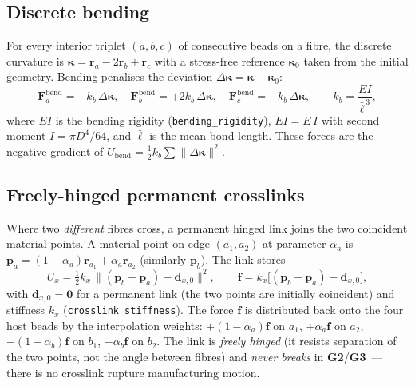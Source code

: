 \documentclass[11pt]{article}
\newcommand{\rv}{\mathbf{r}}
\newcommand{\Fv}{\mathbf{F}}
\newcommand{\GTwo}{\textcolor{g2col}{\textbf{G2}}}
\newcommand{\GThree}{\textcolor{g3col}{\textbf{G3}}}
\newcommand{\code}[1]{\texttt{\small #1}}
\begin{document}
\subsection{Discrete bending}

For every interior triplet $(a,b,c)$ of consecutive beads on a fibre, the discrete curvature is
$\boldsymbol\kappa = \rv_a - 2\rv_b + \rv_c$ with a stress-free reference $\boldsymbol\kappa_0$
taken from the initial geometry. Bending penalises the deviation
$\Delta\boldsymbol\kappa=\boldsymbol\kappa-\boldsymbol\kappa_0$:
\begin{equation}
  \Fv_a^{\text{bend}} = -k_b\,\Delta\boldsymbol\kappa,\quad
  \Fv_b^{\text{bend}} = +2k_b\,\Delta\boldsymbol\kappa,\quad
  \Fv_c^{\text{bend}} = -k_b\,\Delta\boldsymbol\kappa,
  \qquad
  k_b = \frac{EI}{\bar\ell^{\,3}},
  \label{eq:bend}
\end{equation}
where $EI$ is the bending rigidity (\code{bending\_rigidity}), $EI = E\,I$ with second moment
$I=\pi D^4/64$, and $\bar\ell$ is the mean bond length. These forces are the negative gradient of
$U_{\text{bend}}=\tfrac12 k_b\sum\|\Delta\boldsymbol\kappa\|^2$.

\subsection{Freely-hinged permanent crosslinks}

Where two \emph{different} fibres cross, a permanent hinged link joins the two coincident
material points. A material point on edge $(a_1,a_2)$ at parameter $\alpha_a$ is
$\mathbf p_a=(1-\alpha_a)\rv_{a_1}+\alpha_a\rv_{a_2}$ (similarly $\mathbf p_b$). The link stores
\begin{equation}
  U_x = \tfrac12 k_x\,\bigl\|(\mathbf p_b-\mathbf p_a)-\mathbf d_{x,0}\bigr\|^2,
  \qquad
  \mathbf f = k_x\bigl[(\mathbf p_b-\mathbf p_a)-\mathbf d_{x,0}\bigr],
  \label{eq:xlink}
\end{equation}
with $\mathbf d_{x,0}=\mathbf 0$ for a permanent link (the two points are initially coincident)
and stiffness $k_x$ (\code{crosslink\_stiffness}). The force $\mathbf f$ is distributed back onto
the four host beads by the interpolation weights:
$+(1-\alpha_a)\mathbf f$ on $a_1$, $+\alpha_a\mathbf f$ on $a_2$,
$-(1-\alpha_b)\mathbf f$ on $b_1$, $-\alpha_b\mathbf f$ on $b_2$. The link is \emph{freely hinged}
(it resists separation of the two points, not the angle between fibres) and \emph{never breaks} in
\GTwo/\GThree\ --- there is no crosslink rupture manufacturing motion.
\end{document}
